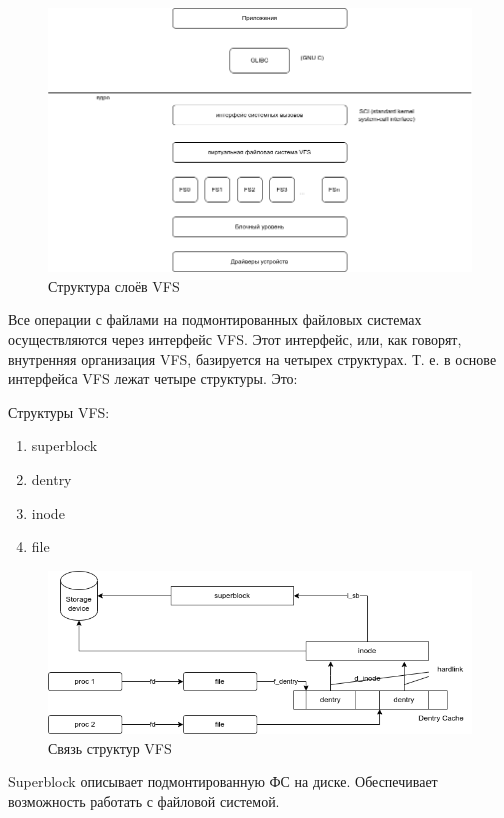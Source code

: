 \documentclass[a4paper,12pt]{article}
\begin{document}
\begin{figure}[ht]
	\centering
	\includegraphics[width=\linewidth]{vfs-structure}
	\caption{Структура слоёв VFS}
\end{figure}

Все операции с файлами на подмонтированных файловых системах осуществляются через интерфейс VFS. Этот интерфейс, или, как говорят, внутренняя организация VFS, базируется на четырех структурах. Т. е. в основе интерфейса VFS лежат четыре структуры. Это:

Структуры VFS:

\begin{enumerate}
	\item superblock
	\item dentry
	\item inode
	\item file
\end{enumerate}

\begin{figure}[ht]
	\centering
	\includegraphics[width=\linewidth]{vfs-structs}
	\caption{Связь структур VFS}
\end{figure}

Superblock описывает подмонтированную ФС на диске. Обеспечивает возможность работать с файловой системой.
\end{document}
